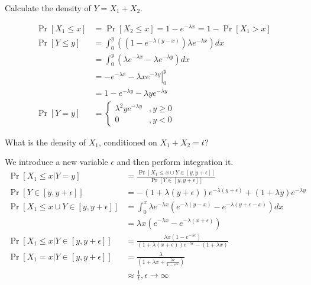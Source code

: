 \documentclass[11pt]{article}
\newcommand*\Eval[3]{\left.#1\right\rvert_{#2}^{#3}}
\begin{document}
\begin{Parts}
    
    \Part Calculate the density of $Y = X_1 + X_2$.

    \begin{Answer}
        \begin{align*}
            \Pr[X_1 \leq x] &= \Pr[X_2 \leq x] = 1 - e^{-\lambda x} = 1 - \Pr[X_1 > x] \\
            \Pr[Y \leq y]   &= \int_0^y ((1 - e^{-\lambda(y - x)})\lambda e^{-\lambda x}) dx \\
                            &= \int_0^y (\lambda e^{-\lambda x} - \lambda e^{-\lambda y} )dx \\
                            &= \Eval{-e^{-\lambda x} - \lambda x e^{-\lambda y}}{0}{y} \\
                            &= 1 - e^{-\lambda y} - \lambda y e^{-\lambda y} \\
            \Pr[Y = y]      &= \begin{cases}
                \lambda^2 ye^{-\lambda y} &, y \geq 0 \\
                0                         &, y < 0
            \end{cases}
        \end{align*}
    \end{Answer}

    \Part What is the density of $X_1$, conditioned on $X_1 + X_2 = t$?

    \begin{Answer}
        We introduce a new variable $\epsilon$ and then perform integration it. 
        \begin{align*}
            \Pr[X_1 \leq x | Y=y]                      &= \frac{\Pr[X_1 \leq x \cup Y \in [y, y+\epsilon]]}{\Pr[Y \in [y, y+\epsilon]]} \\
            \Pr[Y \in [y, y+\epsilon]]                 &= -(1 + \lambda(y + \epsilon)) e^{-\lambda (y+\epsilon)} + (1 + \lambda y)e^{-\lambda y} \\
            \Pr[X_1 \leq x \cup Y \in [y, y+\epsilon]] &= \int_0^x \lambda e^{-\lambda x} (e^{-\lambda(y-x)} - e^{-\lambda(y + \epsilon -x)}) dx \\
                                                       &= \lambda x (e^{-\lambda x} - e^{-\lambda(x + \epsilon)}) \\
            \Pr[X_1 \leq x | Y \in [y, y+\epsilon]]    &= \frac{\lambda x(1 - e^{-\lambda \epsilon})}{(1 + \lambda(x + \epsilon))e^{-\lambda \epsilon} - (1 + \lambda x)} \\
            \Pr[X_1 = x | Y \in [y, y+\epsilon]]       &= \frac{\lambda}{(1 + \lambda x + \frac{\lambda \epsilon}{1 - e^{\lambda \epsilon}})} \\
                                                       &\approx \frac{1}{t}, \epsilon \to \infty
        \end{align*}
    \end{Answer}

\end{Parts}
\end{document}
